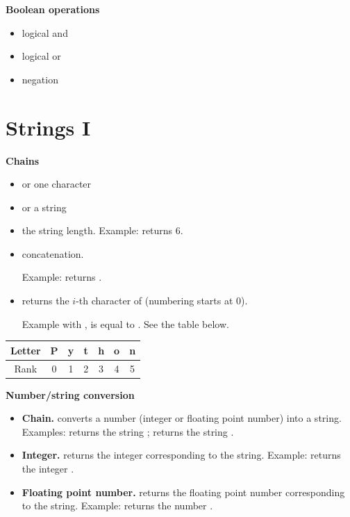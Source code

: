 \documentclass[11pt,class=report,crop=false]{standalone}
\begin{document}
\bigskip
  
\textbf{Boolean operations}
  \begin{itemize}
    \item {} \quad \quad logical \og{}and\fg{}
    	\item {} \quad logical \og{}or\fg{}
    	\item {} \quad negation
  \end{itemize} 
  
  
\section{Strings I}

\textbf{Chains}

\begin{itemize}
  \item {} \quad or \quad {} \quad one character
  \item {}\quad or \quad {} \quad a string
  \item {}\quad the string length. Example:  returns $6$.
  \item {}\quad concatenation.   
  
  Example:  returns .
  
  \item {}\quad returns the $i$-th character of  (numbering starts at $0$). 
  
  Example with ,  is equal to . See the table below.
\end{itemize}

\begin{center}
\begin{tabular}{|c||c|c|c|c|c|c|}
\hline
Letter & \textbf{P} & \textbf{y} & \textbf{t} & \textbf{h} & \textbf{o} & \textbf{n} \\ \hline
Rank & 0 & 1 & 2 & 3 & 4 & 5 \\ \hline
\end{tabular}
\end{center}


\textbf{Number/string conversion}

\begin{itemize}
  \item \textbf{Chain.} \quad converts a number (integer or floating point number) into a string.
  Examples:  returns the string ;  returns the string .
  
  \item \textbf{Integer.} \quad returns the integer corresponding to the string. Example:  returns the integer .
  
   \item \textbf{Floating point number.} \quad returns the floating point number corresponding to the string. Example:  returns the number . 
 \end{itemize}  
\end{document}
